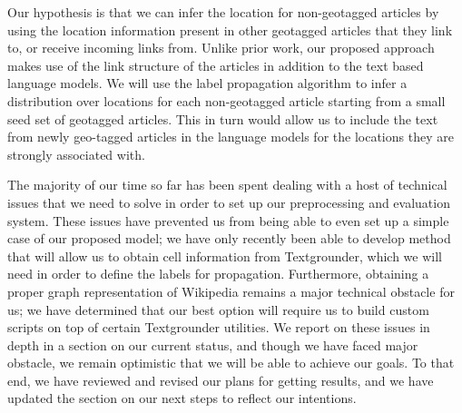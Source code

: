 \par Our hypothesis is that we can infer the location for non-geotagged
articles by using the location information present in other geotagged articles
that they link to, or receive incoming links from. Unlike prior work, our
proposed approach makes use of the link structure of the articles in addition
to the text based language models. We will use the label propagation algorithm
to infer a distribution over locations for each non-geotagged article starting
from a small seed set of geotagged articles. This in turn would allow us to
include the text from newly geo-tagged articles in the language models for the
locations they are strongly associated with.

\par The majority of our time so far has been spent dealing with a host of
technical issues that we need to solve in order to set up our preprocessing
and evaluation system. These issues have prevented us from being able to even
set up a simple case of our proposed model; we have only recently been able to
develop method that will allow us to obtain cell information from
Textgrounder, which we will need in order to define the labels for
propagation. Furthermore, obtaining a proper graph representation of Wikipedia
remains a major technical obstacle for us; we have determined that our best
option will require us to build custom scripts on top of certain Textgrounder
utilities. We report on these issues in depth in a section on our current
status, and though we have faced major obstacle, we remain optimistic that we
will be able to achieve our goals. To that end, we have reviewed and revised
our plans for getting results, and we have updated the section on our next
steps to reflect our intentions.


